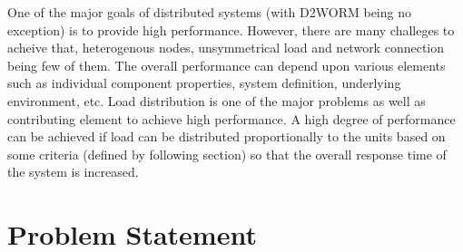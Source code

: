 One of the major goals of distributed systems (with \acrshort{D2WORM} being no exception) is to provide high performance.\cite{Kuz:2008aa} However, there are many challeges to acheive that, heterogenous nodes, unsymmetrical load and network connection being few of them. The  overall performance can depend upon various elements such as individual component properties, system definition, underlying environment, etc. Load distribution is one of the major problems as well as contributing element to achieve high performance.  A high degree of performance can be achieved if load can be distributed proportionally to the units based on some criteria (defined by following section) so that the overall response time of the system is increased.\cite{Chakraborty:2015aa, Steen:2011aa} 


\section{Problem Statement}\label{section:introduction/problemStatement}


